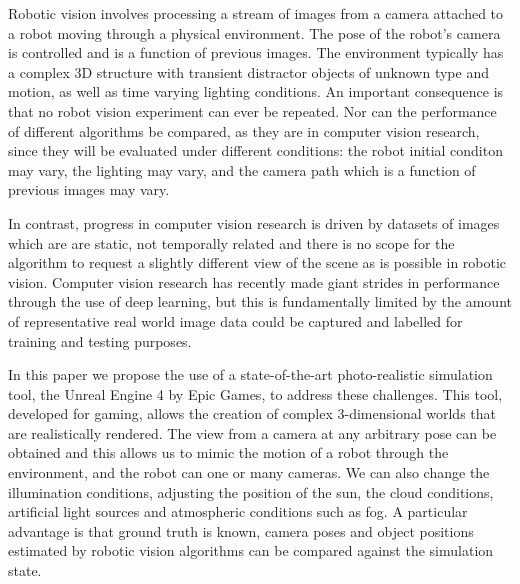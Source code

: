 Robotic vision involves processing a stream of images from a camera attached to a robot moving through a physical environment.
The pose of the robot's camera is controlled and is a function of previous images.  The environment typically has a complex 3D structure with transient 
distractor objects of unknown type and motion, as well as time varying lighting conditions.
An important consequence is that no robot vision experiment can ever be repeated.
Nor can the performance of different algorithms be compared, as they are in computer vision research, since they will be evaluated under different conditions: the robot initial conditon may vary, the lighting may vary, and the camera path which is a function of previous images may vary.

In contrast,  progress in computer vision research is driven by datasets of images which are are static, not temporally related and there is no scope for the algorithm to
request a slightly different view of the scene as is possible in robotic vision.
Computer vision research has recently made giant strides in performance through the use of deep learning, but this is fundamentally limited by the amount of representative real world image data could be captured and labelled for  training and testing purposes. 

In this paper we propose the use of a state-of-the-art photo-realistic simulation tool, the Unreal Engine 4 by Epic Games, to address these challenges.
This tool, developed for gaming,  allows the creation of complex 3-dimensional worlds that are realistically rendered.  The  view from a camera at any arbitrary pose can be obtained and this allows us to mimic the motion of a robot through the environment, and the robot can one or many cameras. We can also change the illumination conditions, adjusting the position of the sun, the cloud conditions, artificial light sources and atmospheric conditions such as fog.
A particular advantage is that ground truth is known, camera poses and object positions estimated by robotic vision algorithms can be compared against the
simulation state. 

